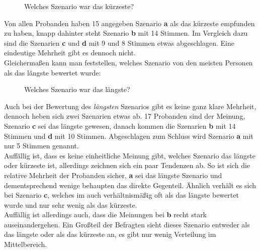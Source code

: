 \documentclass{Paper}
\begin{document}
	\begin{figure}[ht]
	\caption{Welches Szenario war das kürzeste?}
	\end{figure}
		
	Von allen Probanden haben 15 angegeben Szenario \textbf{a} als das kürzeste empfunden zu haben, knapp dahinter steht Szenario \textbf{b} mit 14 Stimmen. Im Vergleich dazu sind die Szenarien \textbf{c} und \textbf{d} mit 9 und 8 Stimmen etwas abgeschlagen. Eine eindeutige Mehrheit gibt es dennoch nicht.\\
	Gleichermaßen kann man feststellen, welches Szenario von den meisten Personen als das längste bewertet wurde:

	\begin{figure}[ht]
	\caption{Welches Szenario war das längste?}
	\end{figure}	

	Auch bei der Bewertung des \textit{längsten} Szenarios gibt es keine ganz klare Mehrheit, dennoch heben sich zwei Szenarien etwas ab. 17 Probanden sind der Meinung, Szenario \textbf{c} sei das längste gewesen, danach kommen die Szenarien \textbf{b} mit 14 Stimmen und \textbf{d} mit 10 Stimmen. Abgeschlagen zum Schluss wird Szenario \textbf{a} mit nur 5 Stimmen genannt.\\
	Auffällig ist, dass es keine einheitliche Meinung gibt, welches Szenario das längste oder kürzeste ist, allerdings zeichnen sich ein paar Tendenzen ab. So ist sich die relative Mehrheit der Probanden sicher, \textbf{a} sei das längste Szenario und dementsprechend wenige behaupten das direkte Gegenteil. Ähnlich verhält es sich bei Szenario \textbf{c}, welches im auch verhältnismäßig oft als das längste bewertet wurde und nur sehr wenig als das kürzeste.\\
	Auffällig ist allerdings auch, dass die Meinungen bei \textbf{b} recht stark auseinandergehen. Ein Großteil der Befragten sieht dieses Szenario entweder als das längste oder als das kürzeste an, es gibt nur wenig Verteilung im Mittelbereich.
		
\end{document}
